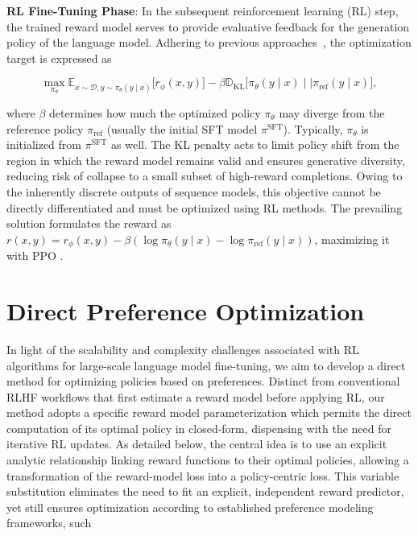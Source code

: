 \textbf{RL Fine-Tuning Phase}: In the subsequent reinforcement learning (RL) step, the trained reward model serves to provide evaluative feedback for the generation policy of the language model. Adhering to previous approaches~\citep{jaques2017sequence, jaques2020human}, the optimization target is expressed as

\begin{equation}\label{eq:RL}
\max_{\pi_{\theta}}  \mathbb{E}_{x\sim \mathcal{D}, y\sim \pi_{\theta}(y \mid x)}\bigl[r_{\phi}(x, y)\bigr] - \beta\mathbb{D}_{\textrm{KL}}\bigl[\pi_{\theta}(y\mid x)\mid \mid \pi_\text{ref}(y\mid x)\bigr],
\end{equation}

where $\beta$ determines how much the optimized policy $\pi_\theta$ may diverge from the reference policy $\pi_\text{ref}$ (usually the initial SFT model $\pi^\text{SFT}$). Typically, $\pi_\theta$ is initialized from $\pi^\text{SFT}$ as well. The KL penalty acts to limit policy shift from the region in which the reward model remains valid and ensures generative diversity, reducing risk of collapse to a small subset of high-reward completions. Owing to the inherently discrete outputs of sequence models, this objective cannot be directly differentiated and must be optimized using RL methods. The prevailing solution \citep{ziegler2020finetuning, stiennon2022learning, bai2022training, ouyang2022training} formulates the reward as ${r(x, y) = r_{\phi}(x, y) -\beta (\log \pi_{\theta}(y\mid x) - \log \pi_\text{ref}(y\mid x))}$, maximizing it with PPO \cite{schulman2017proximal}. 

\section{Direct Preference Optimization}\label{sec:DPO}

In light of the scalability and complexity challenges associated with RL algorithms for large-scale language model fine-tuning, we aim to develop a direct method for optimizing policies based on preferences. Distinct from conventional RLHF workflows that first estimate a reward model before applying RL, our method adopts a specific reward model parameterization which permits the direct computation of its optimal policy in closed-form, dispensing with the need for iterative RL updates. As detailed below, the central idea is to use an explicit analytic relationship linking reward functions to their optimal policies, allowing a transformation of the reward-model loss into a policy-centric loss. This variable substitution eliminates the need to fit an explicit, independent reward predictor, yet still ensures optimization according to established preference modeling frameworks, such


